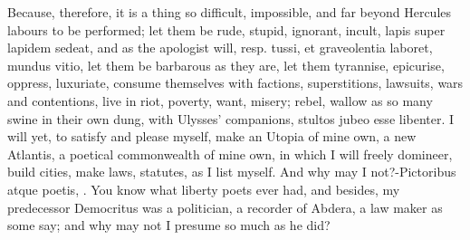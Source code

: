 {Because, therefore, it is a thing so difficult, impossible, and far
beyond Hercules labours to be performed; let them be rude, stupid,
ignorant, incult, lapis super lapidem sedeat, and as the apologist
will, resp. tussi, et graveolentia laboret, mundus vitio, let them be
barbarous as they are, let them tyrannise, epicurise, oppress,
luxuriate, consume themselves with factions, superstitions, lawsuits,
wars and contentions, live in riot, poverty, want, misery; rebel,
wallow as so many swine in their own dung, with Ulysses' companions,
stultos jubeo esse libenter. I will yet, to satisfy and please myself,
make an Utopia of mine own, a new Atlantis, a poetical commonwealth of
mine own, in which I will freely domineer, build cities, make laws,
statutes, as I list myself. And why may I not?-Pictoribus atque
poetis, \etc{}. You know what liberty poets ever had, and besides, my
predecessor Democritus was a politician, a recorder of Abdera, a law
maker as some say; and why may not I presume so much as he did?

}
